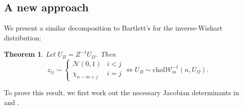 \documentclass[12pt,a4paper,reqno]{amsart}
\numberwithin{equation}{section}
\newtheorem{theorem}{Theorem}[section]
\newcommand{\cholinvwishart}[1]{\mathrm{chol}\mathcal{W}^{-1}_{#1}}
\begin{document}
\subsection{A new approach}

We present a similar decomposition to Bartlett's for the inverse-Wishart distribution:
\begin{theorem}\label{thm:invwishartbartlett}
    Let $U_B = Z^{-1} U_\Omega$.
    Then
    \begin{equation}
        z_{ij} \sim \begin{cases}\mathcal{N}(0, 1) & i < j\\ \chi_{n-m+j} & i = j\end{cases} \iff U_B \sim \cholinvwishart{m}(n, U_\Omega).
    \end{equation}
\end{theorem}

To prove this result, we first work out the necessary Jacobian determinants in  and .
\end{document}

